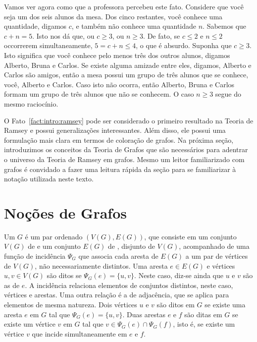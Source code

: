 Vamos ver agora como que a professora percebeu este fato. Considere que você seja um dos seis alunos da mesa. Dos cinco restantes, você conhece uma quantidade, digamos $c$, e também não conhece uma quantidade $n$. Sabemos que $c + n = 5$. Isto nos dá que, ou $c \geq 3$, ou $n \geq 3$. De fato, se $c \leq 2$ e $n \leq 2$ occorrerem simultaneamente, $5 = c + n \leq 4$, o que é absurdo. Suponha que $c \geq 3$. Isto significa que você conhece pelo menos três dos outros alunos, digamos Alberto, Bruna e Carlos. Se existe alguma amizade entre eles, digamos, Alberto e Carlos são amigos, então a mesa possui um grupo de três alunos que se conhece, você, Alberto e Carlos. Caso isto não ocorra, então Alberto, Bruna e Carlos formam um grupo de três alunos que não se conhecem. O caso $n \geq 3$ segue do mesmo raciocínio.

O Fato~\ref{fact:intro:ramsey} pode ser considerado o primeiro resultado na Teoria de Ramsey e possui generalizações interessantes. Além disso, ele possui uma formulação mais clara em termos de coloração de grafos. Na próxima seção, introduzimos os conceitos da Teoria de Grafos que são necessários para adentrar o universo da Teoria de Ramsey em grafos. Mesmo um leitor familiarizado com grafos é convidado a fazer uma leitura rápida da seção para se familiarizar à notação utilizada neste texto.


\section{Noções de Grafos}

Um  $G$ é um par ordenado $(V(G), E(G))$, que consiste em um conjunto $V(G)$ de  e um conjunto $E(G)$ de , disjunto de $V(G)$, acompanhado de uma função de incidência $\Psi_G$ que associa cada aresta de $E(G)$ a um par de vértices de $V(G)$, não necessariamente distintos.
Uma aresta $e \in E(G)$ e vértices $u, v \in V(G)$ são ditos  se $\Psi_G(e) = \{u,v\}$. Neste caso, diz-se ainda que $u$ e $v$ são as  de $e$. A incidência relaciona elementos de conjuntos distintos, neste caso, vértices e arestas.
Uma outra relação é a de adjacência, que se aplica para elementos de mesma natureza. Dois vértices $u$ e $v$ são ditos  em $G$ se existe uma aresta $e$ em $G$ tal que $\Psi_G(e) = \{u,v\}$. Duas arestas $e$ e $f$ são ditas  em $G$ se existe um vértice $v$ em $G$ tal que $v \in \Psi_G(e) \cap \Psi_G(f)$, isto é, se existe um vértice $v$ que incide simultaneamente em $e$ e $f$.

